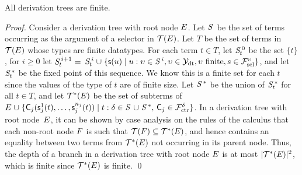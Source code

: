 \begin{theorem}[Termination]%
\label{thm:t}%
\afterDot
All derivation trees are finite.
\end{theorem}
\begin{proof}
Consider a derivation tree with root node $E$.
Let $\SSS$ be the set of terms occurring as the argument of a selector in $\mathcal{T}(E)$.
Let $T$ be the set of terms in $\mathcal{T}(E)$ whose types are finite datatypes.
For each term $t \in T$,
let $\mathit{S}^{\,0}_t$ be the set $\{ t \}$,
for $i \geq 0$ let $\mathit{S}^{\,i+1}_t =$ $\mathit{S}^{\,i}_t \mathrel\cup \{ \textsf{s}( u ) \mid u : \upsilon \in \mathit{S}^{\,i}, \upsilon \in \mathcal{Y}_{\mathrm{dt}}, \upsilon \text{ finite}, s \in \mathcal{F}_{\mathrm{sel}}^{\upsilon}  \}$,
and let $\mathit{S}^{\,\ast}_t$ be the fixed point of this sequence.
We know this is a finite set for each $t$ since the values of the type of $t$ are of finite size.
Let $\mathit{S}^{\,\ast}$ be the union of $\mathit{S}^{\,\ast}_t$ for all $t \in T$,
and let $\mathcal{T}^\ast(E)$ be the set of subterms of $\Ec \mathrel\cup \{ \const C_j( \const s^1_j( t ), \ldots, \const s^{n_j}_j( t ) ) \mid t : \delta \in \SSS \mathrel\cup \SSSS \ast,\, \const C_j \in \Ctr^\delta \}$.
In a derivation tree with root node~$E$,
it can be shown by case analysis on the rules of the calculus that each non-root node $F$ is such that
$\mathcal{T}(F) \subseteq \mathcal{T}^\ast(E)$, and hence contains an equality between two terms from $\mathcal{T}^\ast(E)$ not occurring in its parent node.
Thus, the depth of a branch in a derivation tree with root node $E$ is at most $\left| \smash{\mathcal{T}^\ast(E)}\vphantom{X} \right|{\!}^2$,
which is finite since $\mathcal{T}^\ast(E)$ is finite.
\qed
\end{proof}

